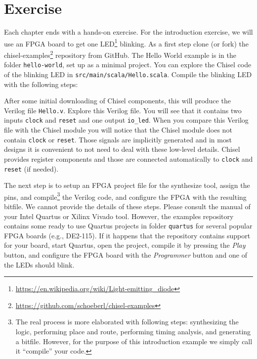 \documentclass[%
    10pt,
    headinclude, footexclude,
    openright, %
    notitlepage,
    cleardoubleempty,
    headsepline,
    pointlessnumbers,
    bibtotoc, idxtotoc,
    ]{scrbook}
\newcommand{\code}[1]{{\small{\texttt{#1}}}}
\newcommand{\myref}[2]{\href{#1}{#2}}
\renewcommand{\myref}[2]{{#2}{\footnote{\url{#1}}}}
\begin{document}
\section{Exercise}

Each chapter ends with a hands-on exercise. For the introduction exercise, we will use an
FPGA board to get one \myref{https://en.wikipedia.org/wiki/Light-emitting_diode}{LED} blinking.
As a first step clone (or fork) the \myref{https://github.com/schoeberl/chisel-examples}{chisel-examples}
repository from GitHub.
The Hello World example is in the folder \code{hello-world}, set up as
a minimal project. You can explore the Chisel code of the blinking LED
in \code{src/main/scala/Hello.scala}.
Compile the blinking LED with the following steps:


After some initial downloading of Chisel components, this will produce the Verilog file \code{Hello.v}.
Explore this Verilog file. You will see that it contains two inputs \code{clock} and \code{reset}
and one output \code{io\_led}. When you compare this Verilog file with the Chisel module
you will notice that the Chisel module does not contain \code{clock} or \code{reset}.
Those signals are implicitly generated and in most designs it is convenient to not need to
deal with these low-level details. Chisel provides register components and those
are connected automatically to \code{clock} and \code{reset} (if needed).

The next step is to setup an FPGA project file for the synthesize tool, assign the pins,
and compile\footnote{The real process is more elaborated with following steps: synthesizing the logic,
performing place and route, performing timing analysis, and generating a bitfile.
However, for the purpose of this introduction example we simply call it ``compile''
your code.} the Verilog code, and configure the FPGA with the resulting bitfile.
We cannot provide the details of these steps. Please consult the manual of
your Intel Quartus or Xilinx Vivado tool.
However, the examples repository contains some ready to use Quartus
projects in folder \code{quartus} for several popular FPGA boards (e.g., DE2-115).
If it happens that the repository contains support for your board, start Quartus, open the project,
compile it by pressing the \emph{Play} button, and configure the FPGA board
with the \emph{Programmer} button and one of the LEDs should blink.
\end{document}
